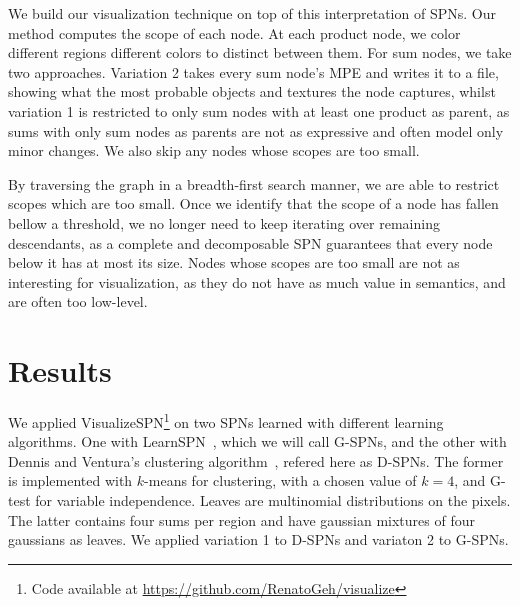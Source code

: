 \documentclass{article}
\begin{document}
We build our visualization technique on top of this interpretation of SPNs. Our method computes the
scope of each node. At each product node, we color different regions different colors to distinct
between them. For sum nodes, we take two approaches. Variation 2 takes every sum node's MPE and
writes it to a file, showing what the most probable objects and textures the node captures, whilst
variation 1 is restricted to only sum nodes with at least one product as parent, as sums with only
sum nodes as parents are not as expressive and often model only minor changes. We also skip any
nodes whose scopes are too small.

By traversing the graph in a breadth-first search manner, we are able to restrict scopes which are
too small. Once we identify that the scope of a node has fallen bellow a threshold, we no longer
need to keep iterating over remaining descendants, as a complete and decomposable SPN guarantees
that every node below it has at most its size. Nodes whose scopes are too small are not as
interesting for visualization, as they do not have as much value in semantics, and are often too
low-level.

\section{Results}
\label{sec:results}

We applied VisualizeSPN\footnote{\scriptsize Code available at
\url{https://github.com/RenatoGeh/visualize}} on two SPNs learned with different learning
algorithms. One with LearnSPN~\cite{gens13}, which we will call G-SPNs, and the other with Dennis
and Ventura's clustering algorithm~\cite{dennis12}, refered here as D-SPNs. The former is
implemented with $k$-means for clustering, with a chosen value of $k=4$, and G-test for variable
independence.  Leaves are multinomial distributions on the pixels.  The latter contains four sums
per region and have gaussian mixtures of four gaussians as leaves. We applied variation 1 to D-SPNs
and variaton 2 to G-SPNs.
\end{document}
